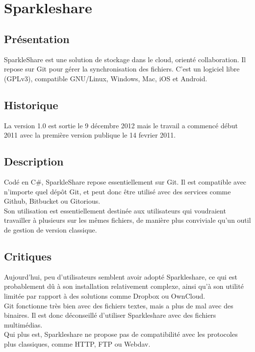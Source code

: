\section{Sparkleshare}
\thispagestyle{EIP} %
\subsection{Présentation}
SparkleShare est une solution de stockage dans le cloud, orienté collaboration. Il repose sur Git pour gérer la synchronisation des fichiers. C'est un logiciel libre (GPLv3), compatible GNU/Linux, Windows, Mac, iOS et Android.\\

\subsection{Historique}
La version 1.0 est sortie le 9 décembre 2012 mais le travail a commencé début 2011 avec la première version publique le 14 fevrier 2011.\\

\subsection{Description}
Codé en C\#, SparkleShare repose essentiellement sur Git. Il est compatible avec n'importe quel dépôt Git, et peut donc être utilisé avec des services comme Github, Bitbucket ou Gitorious.\\

Son utilisation est essentiellement destinée aux utilisateurs qui voudraient travailler à plusieurs sur les mêmes fichiers, de manière plus conviviale qu'un outil de gestion de version classique.\\

\subsection{Critiques}
Aujourd'hui, peu d'utilisateurs semblent avoir adopté Sparkleshare, ce qui est probablement dû à son installation relativement complexe, ainsi qu'à son utilité limitée par rapport à des solutions comme Dropbox ou OwnCloud.\\

Git fonctionne très bien avec des fichiers textes, mais a plus de mal avec des binaires. Il est donc déconseillé d'utiliser Sparkleshare avec des fichiers multimédias.\\
Qui plus est, Sparkleshare ne propose pas de compatibilité avec les protocoles plus classiques, comme HTTP, FTP ou Webdav.\\